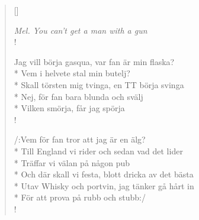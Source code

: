 
\settowidth{\versewidth}{Nej, för fan bara blunda och svälj}



\begin{verse}[\versewidth]

\flagverse{}
\emph{Mel. You can't get a man with a gun}\\!


Jag vill börja gasqua, var fan är min flaska?\\*
Vem i helvete stal min butelj?\\*
Skall törsten mig tvinga, en TT börja svinga\\*
Nej, för fan bara blunda och svälj\\*
Vilken smörja, får jag spörja\\!

/:Vem för fan tror att jag är en älg?\\*
Till England vi rider och sedan vad det lider\\*
Träffar vi välan på någon pub\\*
Och där skall vi festa, blott dricka av det bästa\\*
Utav Whisky och portvin, jag tänker gå hårt in\\*
För att prova på rubb och stubb:/\\!




\end{verse}

